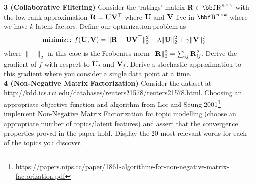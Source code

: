 \documentclass[12pt,letterpaper,fleqn]{hmcpset}
\begin{document}
\textbf{3 (Collaborative Filtering)} Consider the `ratings' matrix $\Rb\in\RR^{n\times n}$
with the low rank approximation ${\bf R} = {\bf U} {\bf V}^\top$ where ${\bf U}$ and ${\bf V}$ live in
$\RR^{n\times k}$ where we have $k$ latent factors. Define our optimization problem as
\begin{align*}
    \text{minimize: } & f({\bf U},{\bf V}) = \|{\bf R} - {\bf U}{\bf V}^\top\|_2^2 + \lambda\|{\bf U}\|_2^2 + \gamma\|{\bf V}\|_2^2
\end{align*}
where $\|\cdot\|_2$ in this case is the Frobenius norm $\|{\bf R}\|_2^2 = \sum_{ij}{\bf R}_{ij}^2$.
Derive the gradient of $f$ with respect to ${\bf U}_i$ and ${\bf V}_j$. Derive a stochastic
approximation to this gradient where you consider a single data point at a time.\\

\textbf{4 (Non-Negative Matrix Factorization)} Consider the dataset at
\url{http://kdd.ics.uci.edu/databases/reuters21578/reuters21578.html}. Choosing an appropriate
objective function and algorithm from Lee and Seung 2001\footnote{\url{https://papers.nips.cc/paper/1861-algorithms-for-non-negative-matrix-factorization.pdf}}
implement Non-Negative Matrix Factorization for topic modelling (choose an appropriate number
of topics/latent features) and assert that the convergence properties proved in the paper hold. 
Display the 20 most relevant words for each of the topics you discover.
\end{document}
